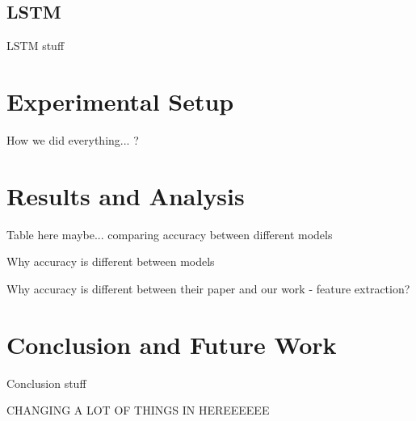 \documentclass[11pt,a4paper]{article}
\begin{document}
\subsection{LSTM}
LSTM stuff 

\section{Experimental Setup}
How we did everything... ? 

\section{Results and Analysis}
Table here maybe... comparing accuracy between different models 

Why accuracy is different between models

Why accuracy is different between their paper and our work - feature extraction?

\section{Conclusion and Future Work}
Conclusion stuff

CHANGING A LOT OF THINGS IN HEREEEEEE



%
%
%
%
\end{document}
